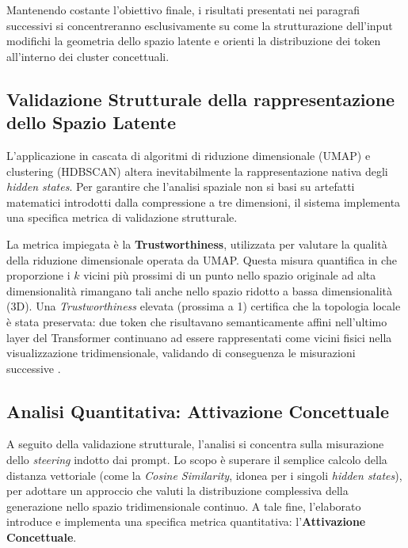 Mantenendo costante l'obiettivo finale, i risultati presentati nei paragrafi successivi si concentreranno esclusivamente su come la strutturazione dell'input modifichi la geometria dello spazio latente e orienti la distribuzione dei token all'interno dei cluster concettuali.

\subsection{Validazione Strutturale della rappresentazione dello Spazio Latente}
\label{sec:validazione_strutturale}

L'applicazione in cascata di algoritmi di riduzione dimensionale (UMAP) e clustering (HDBSCAN) altera inevitabilmente la rappresentazione nativa degli \textit{hidden states}. Per garantire che l'analisi spaziale non si basi su artefatti matematici introdotti dalla compressione a tre dimensioni, il sistema implementa una specifica metrica di validazione strutturale.

La metrica impiegata è la \textbf{Trustworthiness}, utilizzata per valutare la qualità della riduzione dimensionale operata da UMAP. Questa misura quantifica in che proporzione i $k$ vicini più prossimi di un punto nello spazio originale ad alta dimensionalità rimangano tali anche nello spazio ridotto a bassa dimensionalità (3D). Una \textit{Trustworthiness} elevata (prossima a 1) certifica che la topologia locale è stata preservata: due token che risultavano semanticamente affini nell'ultimo layer del Transformer continuano ad essere rappresentati come vicini fisici nella visualizzazione tridimensionale, validando di conseguenza le misurazioni successive \cite{arxiv_trustworthy_dr_2024}.

\subsection{Analisi Quantitativa: Attivazione Concettuale}
\label{sec:metriche_dislocamento}

A seguito della validazione strutturale, l'analisi si concentra sulla misurazione dello \textit{steering} indotto dai prompt. Lo scopo è superare il semplice calcolo della distanza vettoriale (come la \textit{Cosine Similarity}, idonea per i singoli \textit{hidden states}), per adottare un approccio che valuti la distribuzione complessiva della generazione nello spazio tridimensionale continuo. A tale fine, l'elaborato introduce e implementa una specifica metrica quantitativa: l'\textbf{Attivazione Concettuale}.

